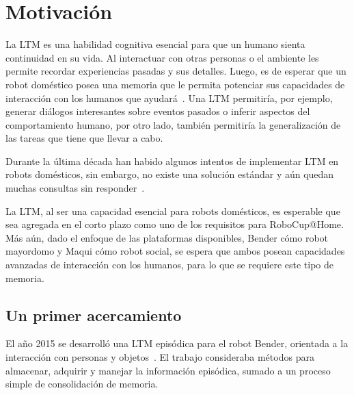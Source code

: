 


\section{Motivación}

La LTM es una habilidad cognitiva esencial para que un humano sienta continuidad en su vida. Al interactuar con otras personas o el ambiente les permite recordar experiencias pasadas y sus detalles. Luego, es de esperar que un robot doméstico posea una memoria que le permita potenciar sus capacidades de interacción con los humanos que ayudará~\cite{Vijayakumar2014}. Una LTM permitiría, por ejemplo, generar diálogos interesantes sobre eventos pasados o inferir aspectos del comportamiento humano, por otro lado, también permitiría la generalización de las tareas que tiene que llevar a cabo.

Durante la última década han habido algunos intentos de implementar LTM en robots domésticos, sin embargo, no existe una solución estándar y aún quedan muchas consultas sin responder~\cite{ltm_in_robocup}.

La LTM, al ser una capacidad esencial para robots domésticos, es esperable que sea agregada en el corto plazo como uno de los requisitos para RoboCup@Home. Más aún, dado el enfoque de las plataformas disponibles, Bender cómo robot mayordomo y Maqui cómo robot social, se espera que ambos posean capacidades avanzadas de interacción con los humanos, para lo que se requiere este tipo de memoria.


\subsection{Un primer acercamiento}\label{sec:primer_acercamiento}

El año 2015 se desarrolló una LTM episódica para el robot Bender, orientada a la interacción con personas y objetos~\cite{Sanchez:2015}. El trabajo consideraba métodos para almacenar, adquirir y manejar la información episódica, sumado a un proceso simple de consolidación de memoria.

